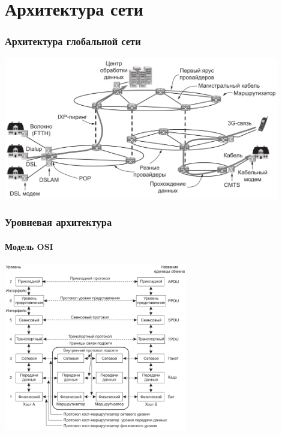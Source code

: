 \documentclass{../../slides-style}
\begin{document}
    \begin{frame}[plain]
        \titlepage
    \end{frame}

    \section{Архитектура сети}

    \begin{frame}
        \frametitle{Архитектура глобальной сети}
        \begin{center}
            \includegraphics[width=0.9\textwidth]{internetArchitecture.png}
        \end{center}
    \end{frame}

    \begin{frame}
        \frametitle{Уровневая архитектура}
        \framesubtitle{Модель OSI}
        \begin{center}
            \includegraphics[width=0.6\textwidth]{osiStack.png}
        \end{center}
    \end{frame}
\end{document}
